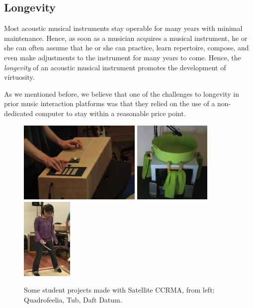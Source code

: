 \subsection{Longevity}
Most acoustic musical instruments stay operable for many years with minimal maintenance.  Hence, as soon as a musician acquires a musical instrument, he or she can often assume that he or she can practice, learn repertoire, compose, and even make adjustments to the instrument for many years to come.  Hence, the \emph{longevity} of an acoustic musical instrument promotes the development of virtuosity.

As we mentioned before, we believe that one of the challenges to longevity in prior music interaction platforms was that they relied on the use of a non-dedicated computer to stay within a reasonable price point. 

\begin{figure}[t]
	\centering
\includegraphics[height=1.55in, trim=20mm 0 50mm 0, clip ]{Photos/Quadrofeeliaperformance.eps}
\includegraphics[height=1.55in]{Photos/Tuub.jpg}
\includegraphics[height=1.55in]{Photos/DancePad3.eps}
	\caption {Some student projects made with Satellite CCRMA, from left: Quadrofeelia, Tub, Daft Datum.}
	\label{Berdahl:fig:studentprojects}
\end{figure}

